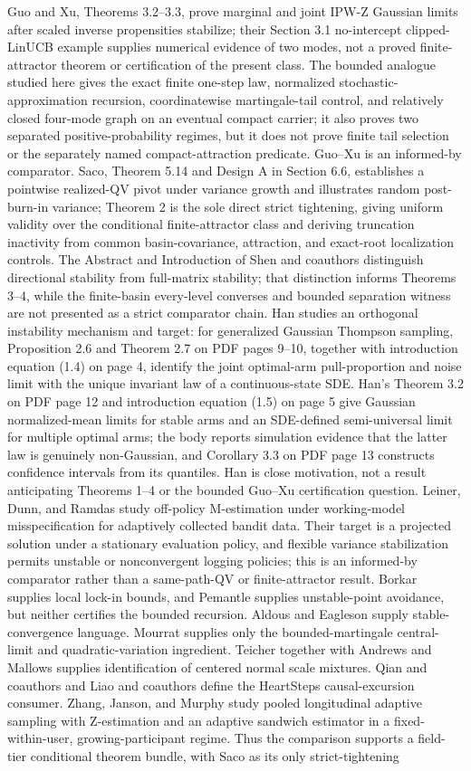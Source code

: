 \documentclass{article}
\begin{document}
Guo and Xu, Theorems 3.2--3.3, prove marginal and joint IPW-Z Gaussian limits after scaled inverse propensities stabilize; their Section 3.1 no-intercept clipped-LinUCB example supplies numerical evidence of two modes, not a proved finite-attractor theorem or certification of the present class. The bounded analogue studied here gives the exact finite one-step law, normalized stochastic-approximation recursion, coordinatewise martingale-tail control, and relatively closed four-mode graph on an eventual compact carrier; it also proves two separated positive-probability regimes, but it does not prove finite tail selection or the separately named compact-attraction predicate. Guo--Xu is an informed-by comparator. Saco, Theorem 5.14 and Design A in Section 6.6, establishes a pointwise realized-QV pivot under variance growth and illustrates random post-burn-in variance; Theorem 2 is the sole direct strict tightening, giving uniform validity over the conditional finite-attractor class and deriving truncation inactivity from common basin-covariance, attraction, and exact-root localization controls. The Abstract and Introduction of Shen and coauthors distinguish directional stability from full-matrix stability; that distinction informs Theorems 3--4, while the finite-basin every-level converses and bounded separation witness are not presented as a strict comparator chain. Han studies an orthogonal instability mechanism and target: for generalized Gaussian Thompson sampling, Proposition 2.6 and Theorem 2.7 on PDF pages 9--10, together with introduction equation (1.4) on page 4, identify the joint optimal-arm pull-proportion and noise limit with the unique invariant law of a continuous-state SDE. Han's Theorem 3.2 on PDF page 12 and introduction equation (1.5) on page 5 give Gaussian normalized-mean limits for stable arms and an SDE-defined semi-universal limit for multiple optimal arms; the body reports simulation evidence that the latter law is genuinely non-Gaussian, and Corollary 3.3 on PDF page 13 constructs confidence intervals from its quantiles. Han is close motivation, not a result anticipating Theorems 1--4 or the bounded Guo--Xu certification question. Leiner, Dunn, and Ramdas study off-policy M-estimation under working-model misspecification for adaptively collected bandit data. Their target is a projected solution under a stationary evaluation policy, and flexible variance stabilization permits unstable or nonconvergent logging policies; this is an informed-by comparator rather than a same-path-QV or finite-attractor result. Borkar supplies local lock-in bounds, and Pemantle supplies unstable-point avoidance, but neither certifies the bounded recursion. Aldous and Eagleson supply stable-convergence language. Mourrat supplies only the bounded-martingale central-limit and quadratic-variation ingredient. Teicher together with Andrews and Mallows supplies identification of centered normal scale mixtures. Qian and coauthors and Liao and coauthors define the HeartSteps causal-excursion consumer. Zhang, Janson, and Murphy study pooled longitudinal adaptive sampling with Z-estimation and an adaptive sandwich estimator in a fixed-within-user, growing-participant regime. Thus the comparison supports a field-tier conditional theorem bundle, with Saco as its only strict-tightening 
\end{document}
